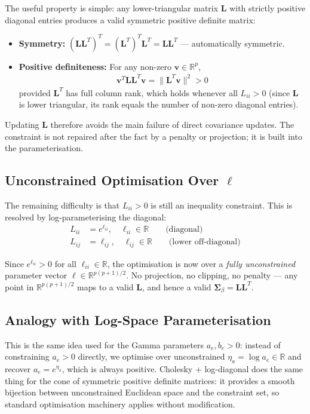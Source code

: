 \documentclass[11pt,a4paper]{article}
\newcommand{\R}{\mathbb{R}}
\begin{document}
The useful property is simple: any lower-triangular matrix $\bm{L}$ with strictly positive diagonal entries produces a valid symmetric positive definite matrix:

\begin{itemize}
  \item \textbf{Symmetry:} $(\bm{L}\bm{L}^T)^T = (\bm{L}^T)^T\bm{L}^T = \bm{L}\bm{L}^T$ \quad --- automatically symmetric.
  \item \textbf{Positive definiteness:} For any non-zero $\bm{v} \in \R^p$,
  \begin{align}
    \bm{v}^T \bm{L}\bm{L}^T \bm{v} = \|\bm{L}^T\bm{v}\|^2 > 0
  \end{align}
  provided $\bm{L}^T$ has full column rank, which holds whenever all $L_{ii} > 0$ (since $\bm{L}$ is lower triangular, its rank equals the number of non-zero diagonal entries).
\end{itemize}

Updating $\bm{L}$ therefore avoids the main failure of direct covariance updates. The constraint is not repaired after the fact by a penalty or projection; it is built into the parameterisation.

\subsection*{Unconstrained Optimisation Over $\bm{\ell}$}

The remaining difficulty is that $L_{ii} > 0$ is still an inequality constraint. This is resolved by log-parameterising the diagonal:
\begin{align}
  L_{ii} &= e^{\ell_{ii}}, \quad \ell_{ii} \in \R \qquad \text{(diagonal)}\\
  L_{ij} &= \ell_{ij}, \quad \ell_{ij} \in \R \qquad \text{(lower off-diagonal)}
\end{align}

Since $e^{\ell_{ii}} > 0$ for all $\ell_{ii} \in \R$, the optimisation is now over a \emph{fully unconstrained} parameter vector $\bm{\ell} \in \R^{p(p+1)/2}$. No projection, no clipping, no penalty --- any point in $\R^{p(p+1)/2}$ maps to a valid $\bm{L}$, and hence a valid $\bm{\Sigma}_\beta = \bm{L}\bm{L}^T$.

\subsection*{Analogy with Log-Space Parameterisation}

This is the same idea used for the Gamma parameters $a_e, b_e > 0$: instead of constraining $a_e > 0$ directly, we optimise over unconstrained $\eta_a = \log a_e \in \R$ and recover $a_e = e^{\eta_a}$, which is always positive. Cholesky + log-diagonal does the same thing for the cone of symmetric positive definite matrices: it provides a smooth bijection between unconstrained Euclidean space and the constraint set, so standard optimisation machinery applies without modification.
\end{document}
